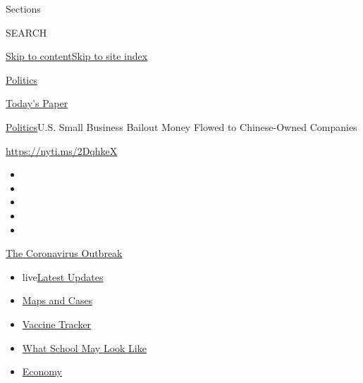 Sections

SEARCH

\protect\hyperlink{site-content}{Skip to
content}\protect\hyperlink{site-index}{Skip to site index}

\href{https://www.nytimes3xbfgragh.onion/section/politics}{Politics}

\href{https://myaccount.nytimes3xbfgragh.onion/auth/login?response_type=cookie\&client_id=vi}{}

\href{https://www.nytimes3xbfgragh.onion/section/todayspaper}{Today's
Paper}

\href{/section/politics}{Politics}\textbar{}U.S. Small Business Bailout
Money Flowed to Chinese-Owned Companies

\url{https://nyti.ms/2DqhkeX}

\begin{itemize}
\item
\item
\item
\item
\item
\end{itemize}

\href{https://www.nytimes3xbfgragh.onion/news-event/coronavirus?action=click\&pgtype=Article\&state=default\&region=TOP_BANNER\&context=storylines_menu}{The
Coronavirus Outbreak}

\begin{itemize}
\tightlist
\item
  live\href{https://www.nytimes3xbfgragh.onion/2020/08/02/world/coronavirus-updates.html?action=click\&pgtype=Article\&state=default\&region=TOP_BANNER\&context=storylines_menu}{Latest
  Updates}
\item
  \href{https://www.nytimes3xbfgragh.onion/interactive/2020/us/coronavirus-us-cases.html?action=click\&pgtype=Article\&state=default\&region=TOP_BANNER\&context=storylines_menu}{Maps
  and Cases}
\item
  \href{https://www.nytimes3xbfgragh.onion/interactive/2020/science/coronavirus-vaccine-tracker.html?action=click\&pgtype=Article\&state=default\&region=TOP_BANNER\&context=storylines_menu}{Vaccine
  Tracker}
\item
  \href{https://www.nytimes3xbfgragh.onion/interactive/2020/07/29/us/schools-reopening-coronavirus.html?action=click\&pgtype=Article\&state=default\&region=TOP_BANNER\&context=storylines_menu}{What
  School May Look Like}
\item
  \href{https://www.nytimes3xbfgragh.onion/live/2020/07/31/business/stock-market-today-coronavirus?action=click\&pgtype=Article\&state=default\&region=TOP_BANNER\&context=storylines_menu}{Economy}
\end{itemize}

